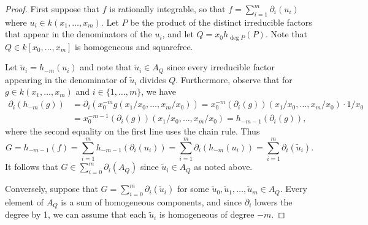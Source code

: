 \documentclass{amsart}
\theoremstyle{definition}
\numberwithin{equation}{section}
\numberwithin{thm}{section}
\begin{document}
\begin{proof}
First suppose that $f$ is rationally integrable, so that $f = \sum_{i=1}^m \partial_i(u_i)$ where $u_i \in k(x_1,\dots,x_m)$.  Let $P$ be the product of the distinct irreducible factors that appear in the denominators of the $u_i$, and let $Q = x_0 h_{\deg{P}}(P)$. Note that $Q \in k[x_0,\dots,x_m]$ is homogeneous and squarefree.

Let $\tilde u_i = h_{-m}(u_i)$ and note that $\tilde u_i \in A_Q$ since every irreducible factor appearing in the denominator of $\tilde u_i$ divides $Q$.  Furthermore, observe that for $g \in k(x_1,\dots,x_m)$ and $i \in \{1,\dots,m\}$, we have
\begin{align*}
\partial_i(h_{-m}(g)) &= \partial_i( x_0^{-m} g(x_1/x_0,\dots,x_m/x_0))=  x_0^{-m}  (\partial_i(g))(x_1/x_0,\dots,x_m/x_0)\cdot 1/x_0\\ &= x_0^{-m-1}  (\partial_i(g))(x_1/x_0,\dots,x_m/x_0) = h_{-m-1}(\partial_i(g)), 
\end{align*}
where the second equality on the first line uses the chain rule. Thus
\[
G = h_{-m-1}(f) = \sum_{i=1}^m h_{-m-1}(\partial_i(u_i)) = \sum_{i=1}^m \partial_i(h_{-m}(u_i)) =  \sum_{i=1}^m \partial_i(\tilde u_i).
\]
It follows that $G\in \sum_{i=0}^m \partial_i(A_Q)$ since $\tilde u_i \in A_Q$ as noted above.

Conversely, suppose that $G = \sum_{i=0}^m \partial_i(\tilde u_i)$ for some $\tilde u_0, \tilde u_1,\dots,\tilde u_m \in A_Q$.  Every element of $A_Q$ is a sum of homogeneous components, and since $\partial_i$ lowers the degree by 1,  we can assume that each $\tilde u_i$ is homogeneous of degree $-m$.


\end{proof}
\end{document}
